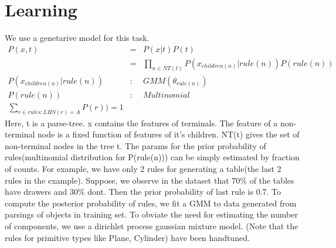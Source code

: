 \documentclass[11pt]{article} %
\begin{document}
\section{Learning}
We use a genetarive model for this task.
\begin{eqnarray}
P(x,t)&=&P(x|t)P(t) \\
&=& \prod_{n \in NT(t)}{P(x_{children(n)} |rule(n) )P(rule(n))}\\
P(x_{children(n)} |rule(n) ) &:& GMM(\theta _{rule(n)})\\
P(rule(n)) &:& Multinomial \\
\sum_{r \in rules:LHS(r)=A}{P(r))}=1
\end{eqnarray}
Here, t is a parse-tree. x contains the features of terminals. The feature of a non-terminal node is a fixed function of features of it's children. NT(t) gives the set of non-terminal nodes in the tree t.
The params for the prior probability of rules(multinomial distribution for P(rule(n))) can be simply estimated by fraction of counts. For example, we have only 2 rules for generating a table(the last 2 rules in the example). Suppose, we observe in the dataset that 70\% of the tables have drawers and 30\% dont. Then the prior probability of last rule is 0.7.
To compute the posterior probability of rules, we fit a GMM to data generated from parsings of objects in training set. To obviate the need for estimating the number of components, we use a dirichlet process gaussian mixture model. 
(Note that the rules for primitive types like Plane, Cylinder) have been handtuned.
\end{document}
